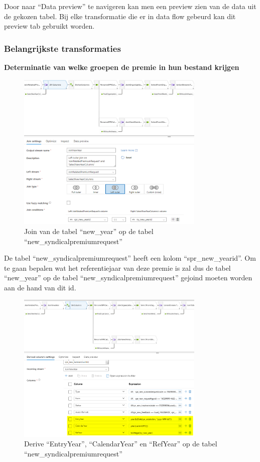 Door naar ``Data preview'' te navigeren kan men een preview zien van de data uit de gekozen tabel. Bij elke transformatie die er in data flow gebeurd kan dit preview tab gebruikt worden.

\subsubsection{Belangrijkste transformaties}

\textbf{Determinatie van welke groepen de premie in hun bestand krijgen}

\begin{figure}[H]
    \centering
    \includegraphics[width=0.8\textwidth]{./graphics/adf/bepalen_groep_1.png}
    \caption{Join van de tabel ``new\_year'' op de tabel ``new\_syndicalpremiumrequest''}
\end{figure}

De tabel ``new\_syndicalpremiumrequest'' heeft een kolom ``spr\_new\_yearid''. Om te gaan bepalen wat het referentiejaar van deze premie is zal dus de tabel ``new\_year'' op de tabel ``new\_syndicalpremiumrequest'' gejoind moeten worden aan de hand van dit id.


\begin{figure}[H]
    \centering
    \includegraphics[width=0.8\textwidth]{./graphics/adf/bepalen_groep_2.png}
    \caption{Derive ``EntryYear'', ``CalendarYear'' en ``RefYear'' op de tabel ``new\_syndicalpremiumrequest''}
\end{figure}


